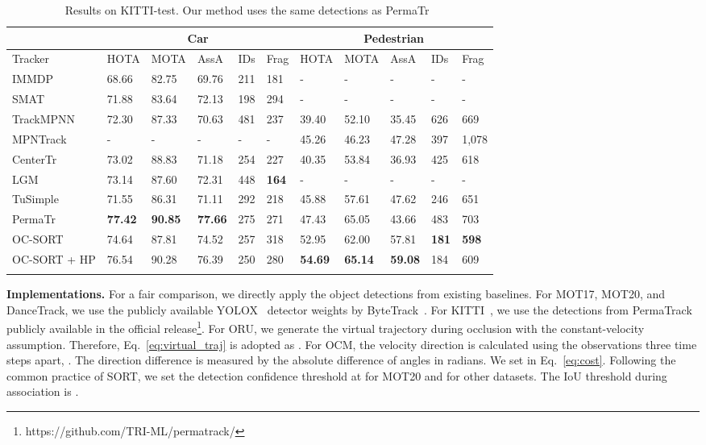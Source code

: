 \documentclass[10pt,twocolumn,letterpaper]{article}
\newcommand*{\aboverulesepcolor}[1]{\noalign{\begingroup 
      \color{#1}\hrule height\aboverulesep 
    \endgroup 
    \kern-\aboverulesep 
  }}
\begin{document}
\begin{table*}[t]
\centering
\caption{Results on KITTI-test. Our method uses the same detections as PermaTr~\cite{permatrack}}
\setlength{\tabcolsep}{8pt}
\scriptsize
\begin{tabular}{ l | p{18px}p{18px}p{18px}p{10px} p{18px}| p{18px}p{18px}p{18px}p{10px}p{18px}}
\toprule
& \multicolumn{5}{c|}{Car} & \multicolumn{5}{c}{Pedestrian}\\ 
\midrule
Tracker & HOTA & MOTA & AssA & IDs& Frag&  HOTA & MOTA  & AssA & IDs & Frag\\
\midrule
IMMDP~\cite{immdp} & 68.66 & 82.75  & 69.76 & 211 & 181 & - & - & - & - & -\\ 
SMAT~\cite{smat} & 71.88 & 83.64  & 72.13 & 198 & 294 & - & -& - & - & -\\ 
TrackMPNN~\cite{rangesh2021trackmpnn} & 72.30 & 87.33  & 70.63 & 481 & 237 & 39.40 & 52.10  & 35.45 & 626 & 669\\
MPNTrack~\cite{mpntrack} & - & -  & - & - & - & 45.26 & 46.23  & 47.28 & 397 & 1,078\\
CenterTr~\cite{centertrack} & 73.02 & 88.83  & 71.18 & 254 & 227 & 40.35 & 53.84  & 36.93 & 425 & 618\\
LGM~\cite{lgm} & 73.14 & 87.60  & 72.31 & 448 & \textbf{164} & - & - & - & - & -\\ 
TuSimple~\cite{tusimple}  & 71.55 & 86.31 & 71.11 & 292 & 218 & 45.88 & 57.61  & 47.62 & 246 & 651\\
\rowcolor{babyblue!20}PermaTr~\cite{permatrack} & \textbf{77.42} & \textbf{90.85}  & \textbf{77.66} & 275 & 271 & 47.43 & 65.05  & 43.66 & 483 & 703\\
\rowcolor{babyblue!20}OC-SORT & 74.64 & 87.81  & 74.52 & 257 & 318 & 52.95 & 62.00  & 57.81 & \textbf{181} & \textbf{598}\\
\rowcolor{babyblue!20}OC-SORT + HP & 76.54  & 90.28 & 76.39 & 250 & 280 & \textbf{54.69} & \textbf{65.14}  & \textbf{59.08} & 184 & 609\\
\aboverulesepcolor{babyblue!20}
\bottomrule
\end{tabular}
\label{table:kitti}
\end{table*}

\noindent\textbf{Implementations.} 
For a fair comparison, we directly apply the object detections from existing baselines. For MOT17, MOT20, and DanceTrack, we use the publicly available YOLOX~\cite{ge2021yolox} detector weights by ByteTrack~\cite{bytetrack}. For KITTI~\cite{kitti}, we use the detections from PermaTrack~\cite{permatrack} publicly available in the official release\footnote{https://github.com/TRI-ML/permatrack/}. For ORU, we generate the virtual trajectory during occlusion with the constant-velocity assumption. Therefore, Eq.~\ref{eq:virtual_traj} is adopted as .
For OCM, the velocity direction is calculated using the observations three time steps apart, \ie . The direction difference is measured by the absolute difference of angles in radians. We set  in Eq.~\ref{eq:cost}. Following the common practice of SORT, we set the detection confidence threshold at  for MOT20 and  for other datasets. The IoU threshold during association is . 
\end{document}

